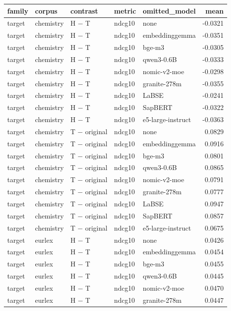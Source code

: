 \begin{tabular}{lllllr}
\toprule
family & corpus & contrast & metric & omitted\_model & mean \\
\midrule
target & chemistry & H − T & ndcg10 & none & -0.0321 \\
target & chemistry & H − T & ndcg10 & embeddinggemma & -0.0351 \\
target & chemistry & H − T & ndcg10 & bge-m3 & -0.0305 \\
target & chemistry & H − T & ndcg10 & qwen3-0.6B & -0.0333 \\
target & chemistry & H − T & ndcg10 & nomic-v2-moe & -0.0298 \\
target & chemistry & H − T & ndcg10 & granite-278m & -0.0355 \\
target & chemistry & H − T & ndcg10 & LaBSE & -0.0241 \\
target & chemistry & H − T & ndcg10 & SapBERT & -0.0322 \\
target & chemistry & H − T & ndcg10 & e5-large-instruct & -0.0363 \\
target & chemistry & T − original & ndcg10 & none & 0.0829 \\
target & chemistry & T − original & ndcg10 & embeddinggemma & 0.0916 \\
target & chemistry & T − original & ndcg10 & bge-m3 & 0.0801 \\
target & chemistry & T − original & ndcg10 & qwen3-0.6B & 0.0865 \\
target & chemistry & T − original & ndcg10 & nomic-v2-moe & 0.0791 \\
target & chemistry & T − original & ndcg10 & granite-278m & 0.0777 \\
target & chemistry & T − original & ndcg10 & LaBSE & 0.0947 \\
target & chemistry & T − original & ndcg10 & SapBERT & 0.0857 \\
target & chemistry & T − original & ndcg10 & e5-large-instruct & 0.0675 \\
target & eurlex & H − T & ndcg10 & none & 0.0426 \\
target & eurlex & H − T & ndcg10 & embeddinggemma & 0.0454 \\
target & eurlex & H − T & ndcg10 & bge-m3 & 0.0455 \\
target & eurlex & H − T & ndcg10 & qwen3-0.6B & 0.0445 \\
target & eurlex & H − T & ndcg10 & nomic-v2-moe & 0.0470 \\
target & eurlex & H − T & ndcg10 & granite-278m & 0.0447 \\

\end{tabular}
